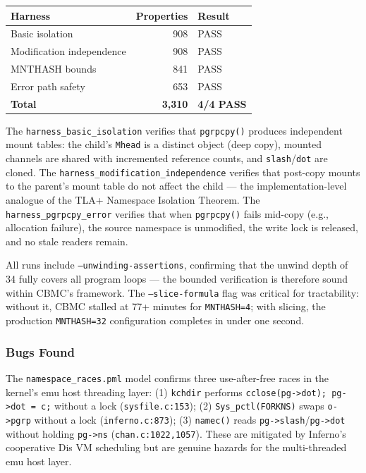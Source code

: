 \documentclass{article}
\begin{document}
\begin{center}
\small
\begin{tabular}{p{3.8cm}rl}
\textbf{Harness} & \textbf{Properties} & \textbf{Result} \\
\hline
Basic isolation & 908 & PASS \\
Modification independence & 908 & PASS \\
MNTHASH bounds & 841 & PASS \\
Error path safety & 653 & PASS \\
\hline
\textbf{Total} & \textbf{3,310} & \textbf{4/4 PASS} \\
\end{tabular}
\end{center}

The \texttt{harness\_basic\_isolation} verifies that \texttt{pgrpcpy()} produces
independent mount tables: the child's \texttt{Mhead} is a distinct object (deep copy),
mounted channels are shared with incremented reference counts, and \texttt{slash}/\texttt{dot}
are cloned. The \texttt{harness\_modification\_independence} verifies that post-copy
mounts to the parent's mount table do not affect the child --- the implementation-level
analogue of the TLA+ Namespace Isolation Theorem. The \texttt{harness\_pgrpcpy\_error}
verifies that when \texttt{pgrpcpy()} fails mid-copy (e.g., allocation failure), the
source namespace is unmodified, the write lock is released, and no stale readers remain.

All runs include \texttt{--unwinding-assertions}, confirming that the unwind depth of 34
fully covers all program loops --- the bounded verification is therefore sound within
CBMC's framework. The \texttt{--slice-formula} flag was critical for tractability:
without it, CBMC stalled at 77+ minutes for \texttt{MNTHASH=4}; with slicing, the
production \texttt{MNTHASH=32} configuration completes in under one second.

\subsubsection{Bugs Found}

The \texttt{namespace\_races.pml} model confirms three
use-after-free races in the kernel's emu host threading layer: (1) \texttt{kchdir}
performs \texttt{cclose(pg->dot); pg->dot = c;} without a lock (\texttt{sysfile.c:153});
(2) \texttt{Sys\_pctl(FORKNS)} swaps \texttt{o->pgrp} without a lock
(\texttt{inferno.c:873}); (3) \texttt{namec()} reads \texttt{pg->slash}/\texttt{pg->dot}
without holding \texttt{pg->ns} (\texttt{chan.c:1022,1057}). These are mitigated by
Inferno's cooperative Dis VM scheduling but are genuine hazards for the multi-threaded
emu host layer.
\end{document}
